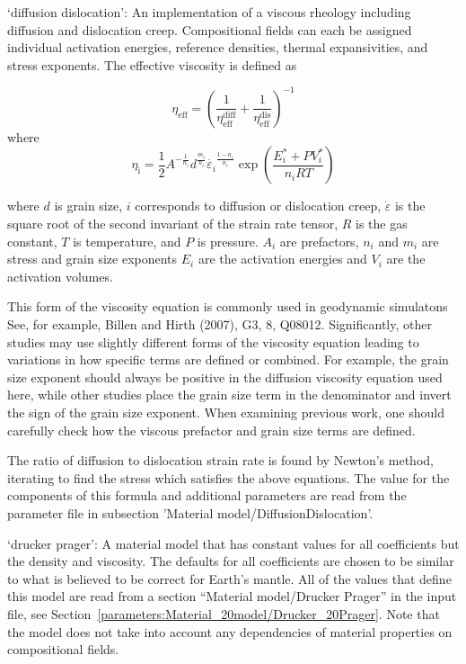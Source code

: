 \begin{itemize}
`diffusion dislocation': An implementation of a viscous rheology including diffusion and dislocation creep. Compositional fields can each be assigned individual activation energies, reference densities, thermal expansivities, and stress exponents. The effective viscosity is defined as 

\[\eta_{\text{eff}} = \left(\frac{1}{\eta_{\text{eff}}^\text{diff}}+ \frac{1}{\eta_{\text{eff}}^\text{dis}}\right)^{-1}\] where \[\eta_{\text{i}} = \frac{1}{2} A^{-\frac{1}{n_i}} d^\frac{m_i}{n_i} \dot{\varepsilon_i}^{\frac{1-n_i}{n_i}} \exp\left(\frac{E_i^\ast + PV_i^\ast}{n_iRT}\right)\] 

where $d$ is grain size, $i$ corresponds to diffusion or dislocation creep, $\dot{\varepsilon}$ is the square root of the second invariant of the strain rate tensor, $R$ is the gas constant, $T$ is temperature, and $P$ is pressure. $A_i$ are prefactors, $n_i$ and $m_i$ are stress and grain size exponents $E_i$ are the activation energies and $V_i$ are the activation volumes. 

This form of the viscosity equation is commonly used in geodynamic simulatons See, for example, Billen and Hirth (2007), G3, 8, Q08012. Significantly, other studies may use slightly different forms of the viscosity equation leading to variations in how specific terms are defined or combined. For example, the grain size exponent should always be positive in the diffusion viscosity equation used here, while other studies place the grain size term in the denominator and invert the sign of the grain size exponent. When examining previous work, one should carefully check how the viscous prefactor and grain size terms are defined.  

The ratio of diffusion to dislocation strain rate is found by Newton's method, iterating to find the stress which satisfies the above equations. The value for the components of this formula and additional parameters are read from the parameter file in subsection 'Material model/DiffusionDislocation'.

`drucker prager': A material model that has constant values for all coefficients but the density and viscosity. The defaults for all coefficients are chosen to be similar to what is believed to be correct for Earth's mantle. All of the values that define this model are read from a section ``Material model/Drucker Prager'' in the input file, see Section~\ref{parameters:Material_20model/Drucker_20Prager}. Note that the model does not take into account any dependencies of material properties on compositional fields. 


\end{itemize}
